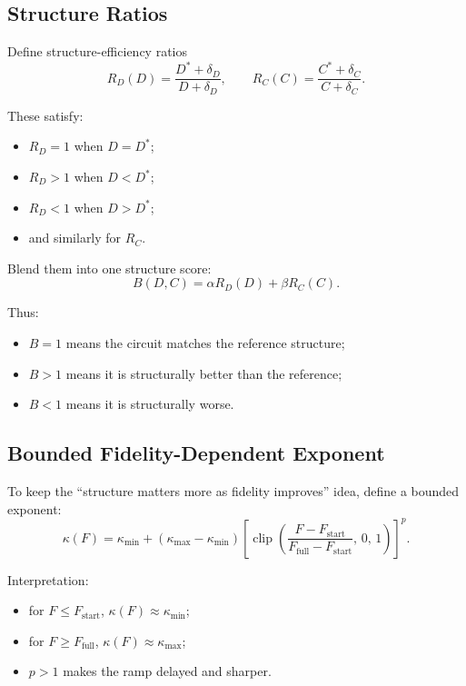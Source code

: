 \documentclass[11pt]{article}
\begin{document}
\subsection{Structure Ratios}

Define structure-efficiency ratios
\[
R_D(D)
=
\frac{D^* + \delta_D}{D + \delta_D},
\qquad
R_C(C)
=
\frac{C^* + \delta_C}{C + \delta_C}.
\]

These satisfy:

\begin{itemize}[leftmargin=*]
\item $R_D = 1$ when $D=D^*$;
\item $R_D > 1$ when $D < D^*$;
\item $R_D < 1$ when $D > D^*$;
\item and similarly for $R_C$.
\end{itemize}

Blend them into one structure score:
\[
B(D,C)
=
\alpha R_D(D)
+
\beta R_C(C).
\]

Thus:

\begin{itemize}[leftmargin=*]
\item $B=1$ means the circuit matches the reference structure;
\item $B>1$ means it is structurally better than the reference;
\item $B<1$ means it is structurally worse.
\end{itemize}

\subsection{Bounded Fidelity-Dependent Exponent}

To keep the ``structure matters more as fidelity improves'' idea, define a bounded exponent:
\[
\kappa(F)
=
\kappa_{\min}
+
\left(\kappa_{\max}-\kappa_{\min}\right)
\left[
\operatorname{clip}\!\left(
\frac{F-F_{\mathrm{start}}}{F_{\mathrm{full}}-F_{\mathrm{start}}},
\,
0,
\,
1
\right)
\right]^p.
\]

Interpretation:

\begin{itemize}[leftmargin=*]
\item for $F \le F_{\mathrm{start}}$, $\kappa(F)\approx \kappa_{\min}$;
\item for $F \ge F_{\mathrm{full}}$, $\kappa(F)\approx \kappa_{\max}$;
\item $p>1$ makes the ramp delayed and sharper.
\end{itemize}
\end{document}
